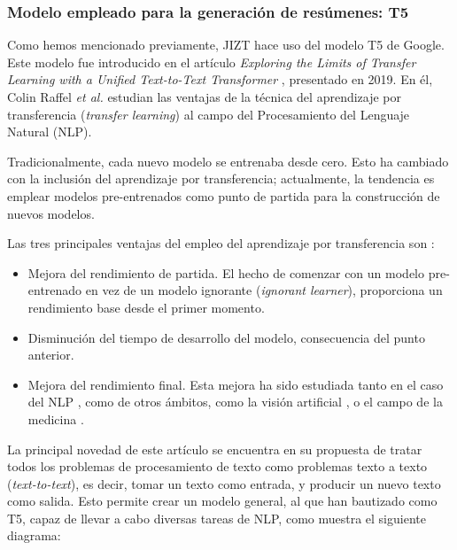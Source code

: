 \bigskip
\subsubsection{Modelo empleado para la generación de resúmenes: T5}

Como hemos mencionado previamente, JIZT hace uso del modelo T5 de Google. Este modelo fue introducido en el artículo \emph{Exploring the Limits of Transfer Learning with a Unified Text-to-Text Transformer} \cite{raffel19}, presentado en 2019. En él, Colin Raffel \emph{et al.} estudian las ventajas de la técnica del aprendizaje por transferencia (\emph{transfer learning}) al campo del Procesamiento del Lenguaje Natural (NLP).

Tradicionalmente, cada nuevo modelo se entrenaba desde cero. Esto ha cambiado con la inclusión del aprendizaje por transferencia; actualmente, la tendencia es emplear modelos pre-entrenados como punto de partida para la construcción de nuevos modelos.

Las tres principales ventajas del empleo del aprendizaje por transferencia son \cite{sarkar18}:

\vspace*{-\baselineskip}
\begin{itemize}
	\item [\textbullet] Mejora del rendimiento de partida. El hecho de comenzar con un modelo pre-entrenado en vez de un modelo ignorante (\emph{ignorant learner}), proporciona un rendimiento base desde el primer momento.
	
	\item [\textbullet] Disminución del tiempo de desarrollo del modelo, consecuencia del punto anterior.
	
	\item [\textbullet] Mejora del rendimiento final. Esta mejora ha sido estudiada tanto en el caso del NLP \cite{kumar21}, como de otros ámbitos, como la visión artificial \cite{ali21}, o el campo de la medicina \cite{liu21}.
\end{itemize}

La principal novedad de este artículo se encuentra en su propuesta de tratar todos los problemas de procesamiento de texto como problemas texto a texto (\emph{text-to-text}), es decir, tomar un texto como entrada, y producir un nuevo texto como salida. Esto permite crear un modelo general, al que han bautizado como T5, capaz de llevar a cabo diversas tareas de NLP, como muestra el siguiente diagrama:

\bigskip


